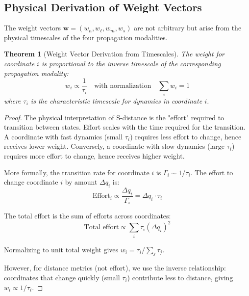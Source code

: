 \documentclass[aps,prd,twocolumn,superscriptaddress,floatfix,nofootinbib]{revtex4-2}
\newtheorem{theorem}{Theorem}[section]
\theoremstyle{remark}
\begin{document}
\subsection{Physical Derivation of Weight Vectors}

The weight vectors $\mathbf{w} = (w_n, w_\ell, w_m, w_s)$ are not arbitrary but arise from the physical timescales of the four propagation modalities.

\begin{theorem}[Weight Vector Derivation from Timescales]
\label{thm:weight_derivation}
The weight for coordinate $i$ is proportional to the inverse timescale of the corresponding propagation modality:
\begin{equation}
w_i \propto \frac{1}{\tau_i} \quad \text{with normalization} \quad \sum_i w_i = 1
\end{equation}
where $\tau_i$ is the characteristic timescale for dynamics in coordinate $i$.
\end{theorem}

\begin{proof}
The physical interpretation of S-distance is the "effort" required to transition between states. Effort scales with the time required for the transition. A coordinate with fast dynamics (small $\tau_i$) requires less effort to change, hence receives lower weight. Conversely, a coordinate with slow dynamics (large $\tau_i$) requires more effort to change, hence receives higher weight.

More formally, the transition rate for coordinate $i$ is $\Gamma_i \sim 1/\tau_i$. The effort to change coordinate $i$ by amount $\Delta q_i$ is:
$$
\text{Effort}_i \propto \frac{\Delta q_i}{\Gamma_i} = \Delta q_i \cdot \tau_i
$$

The total effort is the sum of efforts across coordinates:
$$
\text{Total effort} \propto \sum_i \tau_i (\Delta q_i)^2
$$

Normalizing to unit total weight gives $w_i = \tau_i / \sum_j \tau_j$.

However, for distance metrics (not effort), we use the inverse relationship: coordinates that change quickly (small $\tau_i$) contribute less to distance, giving $w_i \propto 1/\tau_i$.
\end{proof}
\end{document}
